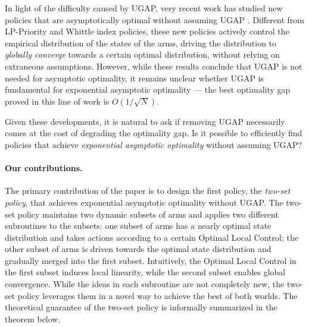 \documentclass[11pt,letterpaper]{article}
\theoremstyle{plain}
\theoremstyle{definition}
\theoremstyle{remark}
\begin{document}
In light of the difficulty caused by UGAP, very recent work has studied new policies that are asymptotically optimal without assuming UGAP \citep{HonXieCheWan_23,HonXieCheWan_24,Yan_24_multichain}. 
Different from LP-Priority and Whittle index policies, these new policies actively control the empirical distribution of the states of the arms, driving the distribution to \emph{globally converge} towards a certain optimal distribution, without relying on extraneous assumptions. 
However, while these results conclude that UGAP is not needed for asymptotic optimality, it remains unclear whether UGAP is fundamental for exponential asymptotic optimality --- the best optimality gap proved in this line of work is $O(1/\sqrt{N})$. 

Given these developments, it is natural to ask if removing UGAP necessarily comes at the cost of degrading the optimality gap. 
Is it possible to efficiently find policies that achieve \emph{exponential asymptotic optimality} without assuming UGAP? 





\paragraph*{Our contributions.}
The primary contribution of the paper is to design the first policy, the \emph{two-set policy}, that achieves exponential asymptotic optimality without UGAP. 
The two-set policy maintains two dynamic subsets of arms and applies two different subroutines to the subsets: 
one subset of arms has a nearly optimal state distribution and takes actions according to a certain Optimal Local Control; the other subset of arms is driven towards the optimal state distribution and gradually merged into the first subset. 
Intuitively, the Optimal Local Control in the first subset induces local linearity, while the second subset enables global convergence. 
While the ideas in each subroutine are not completely new, the two-set policy leverages them in a novel way to achieve the best of both worlds. 
The theoretical guarantee of the two-set policy is informally summarized in the theorem below.  
\end{document}

